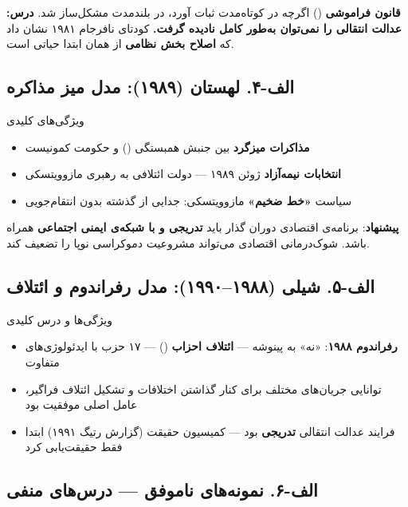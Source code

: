 \begin{notebox}[title={\rl{درس کلیدی}}]
\textbf{قانون فراموشی} () اگرچه در کوتاه‌مدت ثبات آورد، در بلندمدت مشکل‌ساز شد. \textbf{درس: عدالت انتقالی را نمی‌توان به‌طور کامل نادیده گرفت.} کودتای نافرجام ۱۹۸۱ نشان داد که \textbf{اصلاح بخش نظامی} از همان ابتدا حیاتی است.
\end{notebox}

\subsection{الف-۴. لهستان (۱۹۸۹): مدل میز مذاکره}

\begin{bandbox}{ویژگی‌های کلیدی}
\begin{itemize}
  \item \textbf{مذاکرات میزگرد} بین جنبش همبستگی () و حکومت کمونیست
  \item \textbf{انتخابات نیمه‌آزاد} ژوئن ۱۹۸۹ --- دولت ائتلافی به رهبری مازوویتسکی
  \item سیاست \textbf{«خط ضخیم»} مازوویتسکی: جدایی از گذشته بدون انتقام‌جویی
\end{itemize}

\textbf{پیشنهاد}: برنامه‌ی اقتصادی دوران گذار باید \textbf{تدریجی و با شبکه‌ی ایمنی اجتماعی} همراه باشد. شوک‌درمانی اقتصادی می‌تواند مشروعیت دموکراسی نوپا را تضعیف کند.
\end{bandbox}

\subsection{الف-۵. شیلی (۱۹۸۸–۱۹۹۰): مدل رفراندوم و ائتلاف}

\begin{bandbox}{ویژگی‌ها و درس کلیدی}
\begin{itemize}
  \item \textbf{رفراندوم ۱۹۸۸}: «نه» به پینوشه --- \textbf{ائتلاف احزاب} () --- ۱۷ حزب با ایدئولوژی‌های متفاوت
  \item توانایی جریان‌های مختلف برای کنار گذاشتن اختلافات و تشکیل ائتلاف فراگیر، عامل اصلی موفقیت بود
  \item فرایند عدالت انتقالی \textbf{تدریجی} بود --- کمیسیون حقیقت (گزارش رتیگ ۱۹۹۱) ابتدا فقط حقیقت‌یابی کرد
\end{itemize}
\end{bandbox}

\subsection{الف-۶. نمونه‌های ناموفق --- درس‌های منفی}

